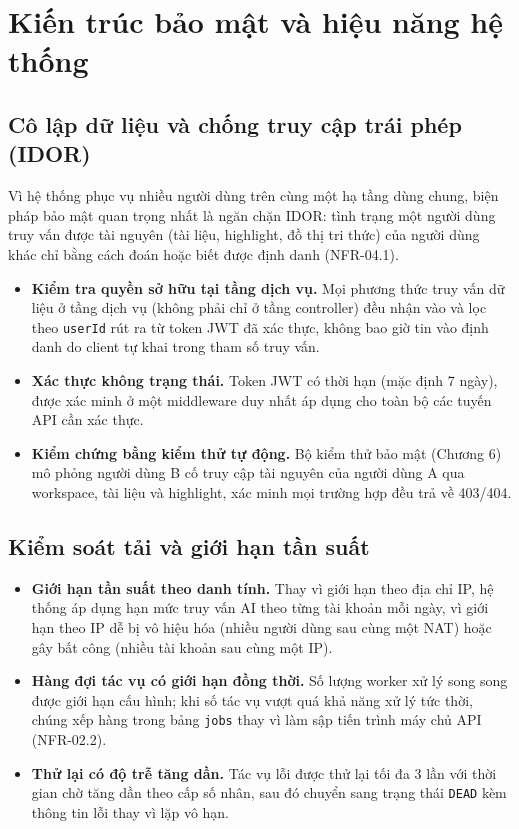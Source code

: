 \section{Kiến trúc bảo mật và hiệu năng hệ thống}

\subsection{Cô lập dữ liệu và chống truy cập trái phép (IDOR)}
Vì hệ thống phục vụ nhiều người dùng trên cùng một hạ tầng dùng chung, biện pháp bảo mật quan trọng nhất là ngăn chặn IDOR: tình trạng một người dùng truy vấn được tài nguyên (tài liệu, highlight, đồ thị tri thức) của người dùng khác chỉ bằng cách đoán hoặc biết được định danh (NFR-04.1).

\begin{itemize}
    \item \textbf{Kiểm tra quyền sở hữu tại tầng dịch vụ.} Mọi phương thức truy vấn dữ liệu ở tầng dịch vụ (không phải chỉ ở tầng controller) đều nhận vào và lọc theo \texttt{userId} rút ra từ token JWT đã xác thực, không bao giờ tin vào định danh do client tự khai trong tham số truy vấn.
    \item \textbf{Xác thực không trạng thái.} Token JWT có thời hạn (mặc định 7 ngày), được xác minh ở một middleware duy nhất áp dụng cho toàn bộ các tuyến API cần xác thực.
    \item \textbf{Kiểm chứng bằng kiểm thử tự động.} Bộ kiểm thử bảo mật (Chương 6) mô phỏng người dùng B cố truy cập tài nguyên của người dùng A qua workspace, tài liệu và highlight, xác minh mọi trường hợp đều trả về 403/404.
\end{itemize}

\subsection{Kiểm soát tải và giới hạn tần suất}
\begin{itemize}
    \item \textbf{Giới hạn tần suất theo danh tính.} Thay vì giới hạn theo địa chỉ IP, hệ thống áp dụng hạn mức truy vấn AI theo từng tài khoản mỗi ngày, vì giới hạn theo IP dễ bị vô hiệu hóa (nhiều người dùng sau cùng một NAT) hoặc gây bất công (nhiều tài khoản sau cùng một IP).
    \item \textbf{Hàng đợi tác vụ có giới hạn đồng thời.} Số lượng worker xử lý song song được giới hạn cấu hình; khi số tác vụ vượt quá khả năng xử lý tức thời, chúng xếp hàng trong bảng \texttt{jobs} thay vì làm sập tiến trình máy chủ API (NFR-02.2).
    \item \textbf{Thử lại có độ trễ tăng dần.} Tác vụ lỗi được thử lại tối đa 3 lần với thời gian chờ tăng dần theo cấp số nhân, sau đó chuyển sang trạng thái \texttt{DEAD} kèm thông tin lỗi thay vì lặp vô hạn.
\end{itemize}

